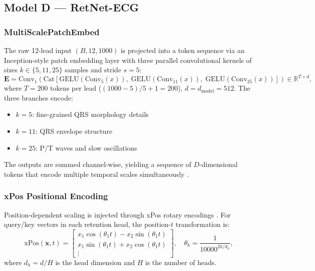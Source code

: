 \subsection{Model D --- RetNet-ECG}
\label{subsec:model_d}

\subsubsection{MultiScalePatchEmbed}

The raw 12-lead input $(B, 12, 1000)$ is projected into a token
sequence via an Inception-style patch embedding layer with three
parallel convolutional kernels of sizes $k \in \{5, 11, 25\}$ samples
and stride $s = 5$:
\begin{equation}
  \mathbf{E} = \mathrm{Conv}_1\!\left(
    \mathrm{Cat}\!\left[
      \mathrm{GELU}(\mathrm{Conv}_{5}(x)),\;
      \mathrm{GELU}(\mathrm{Conv}_{11}(x)),\;
      \mathrm{GELU}(\mathrm{Conv}_{25}(x))
    \right]
  \right) \in \mathbb{R}^{T \times d},
  \label{eq:patch_embed}
\end{equation}
where $T = 200$ tokens per lead ($(1000 - 5)/5 + 1 = 200$),
$d = d_{\mathrm{model}} = 512$.
The three branches encode:
\begin{itemize}
  \item $k{=}5$: fine-grained QRS morphology details
  \item $k{=}11$: QRS envelope structure
  \item $k{=}25$: P/T waves and slow oscillations
\end{itemize}
The outputs are summed channel-wise, yielding a sequence of
$D$-dimensional tokens that encode multiple temporal scales
simultaneously \cite{ref29,ref31}.

\subsubsection{xPos Positional Encoding}

Position-dependent scaling is injected through xPos rotary encodings
\cite{ref18}.
For query/key vectors in each retention head, the position-$t$
transformation is:
\begin{equation}
  \mathrm{xPos}(\mathbf{x}, t) =
  \begin{bmatrix}
    x_1 \cos(\theta_1 t) - x_2 \sin(\theta_1 t) \\
    x_1 \sin(\theta_1 t) + x_2 \cos(\theta_1 t) \\
    \vdots
  \end{bmatrix},
  \quad
  \theta_k = \frac{1}{10000^{2k/d_h}},
  \label{eq:xpos}
\end{equation}
where $d_h = d / H$ is the head dimension and $H$ is the number of
heads.


